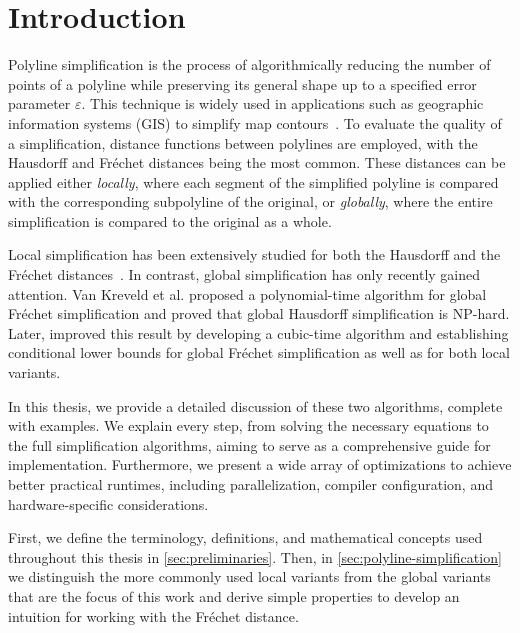 \section{Introduction}
\label{sec:introduction}

Polyline simplification is the process of algorithmically reducing the number of points of a polyline while preserving its general shape up to a specified error parameter \(\varepsilon\). This technique is widely used in applications such as geographic information systems (GIS) to simplify map contours~\cite{algorithms_reduction_number_points_caricature}. To evaluate the quality of a simplification, distance functions between polylines are employed, with the Hausdorff and Fréchet distances being the most common. These distances can be applied either \emph{locally}, where each segment of the simplified polyline is compared with the corresponding subpolyline of the original, or \emph{globally}, where the entire simplification is compared to the original as a whole.

Local simplification has been extensively studied for both the Hausdorff and the Fréchet distances~\cite{polyline_simplification_under_the_local_frechet_distance_has_almost_quadratic_runtime_in_2d_storandtetal,computational_geometric_methods_for_polygonal_approximations_of_a_curve}. In contrast, global simplification has only recently gained attention. Van Kreveld et al. proposed a polynomial-time algorithm for global Fréchet simplification and proved that global Hausdorff simplification is NP-hard. Later, \citeauthor{polyline_simplification_has_cubic_complexity_bringmannetal} improved this result by developing a cubic-time algorithm and establishing conditional lower bounds for global Fréchet simplification as well as for both local variants.

In this thesis, we provide a detailed discussion of these two algorithms, complete with examples. We explain every step, from solving the necessary equations to the full simplification algorithms, aiming to serve as a comprehensive guide for implementation. Furthermore, we present a wide array of optimizations to achieve better practical runtimes, including parallelization, compiler configuration, and hardware-specific considerations.

First, we define the terminology, definitions, and mathematical concepts used throughout this thesis in \cref{sec:preliminaries}. Then, in \cref{sec:polyline-simplification} we distinguish the more commonly used local variants from the global variants that are the focus of this work and derive simple properties to develop an intuition for working with the Fréchet distance.

